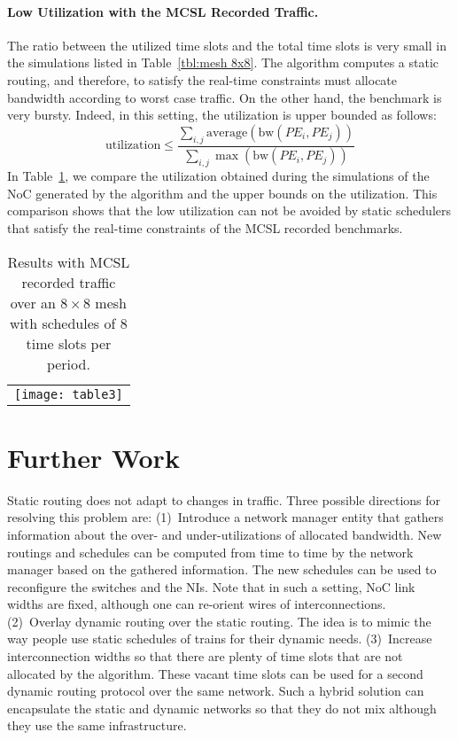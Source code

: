 \documentclass[a4paper,12pt]{article}
\newenvironment{proof sketch}[1]{\noindent {\emph{Proof sketch of #1:}}}{\hfill \qed}
\newcommand{\bw}{\textrm{bw}}
\begin{document}
\paragraph{Low Utilization with the MCSL Recorded Traffic.}  The ratio between the
utilized time slots and the total time slots is very small in the simulations
listed in Table~\ref{tbl:mesh 8x8}. The algorithm computes a static routing, and
therefore, to satisfy the real-time constraints must allocate bandwidth according to
worst case traffic. On the other hand, the benchmark is very bursty.  Indeed, in this
setting, the utilization is upper bounded as follows:
\[
\text{utilization}\leq \frac{\sum_{i,j} \text{average}(\bw(PE_i,PE_j))}
{\sum_{i,j} {\max}(\bw(PE_i,PE_j))}
\]
In Table~\ref{tbl:mcsl utilization}, we compare the utilization obtained during the simulations
of the NoC generated by the algorithm and the upper bounds on the utilization.
This comparison shows that the low utilization can not be avoided by static
schedulers that satisfy the real-time constraints of the MCSL recorded benchmarks.

%
\begin{table}
\centering
\begin{tabular}{c}
\texttt{[image: table3]}
\end{tabular}
  \caption{Results with MCSL recorded traffic over an $8\times 8$ mesh with schedules
    of $8$ time slots per period. }
  \label{tbl:mcsl utilization}
\end{table}
\section{Further Work}\label{sec:further}
Static routing does not adapt to changes in traffic. Three possible directions for
resolving this problem are: (1)~Introduce a network manager entity that gathers
information about the over- and under-utilizations of allocated bandwidth. New
routings and schedules can be computed from time to time by the network manager based
on the gathered information. The new schedules can be used to reconfigure the
switches and the NIs. Note that in such a setting, NoC link widths are fixed, although
one can re-orient wires of interconnections. (2)~Overlay dynamic routing over the
static routing. The idea is to mimic the way people use static schedules of trains
for their dynamic needs. (3)~Increase interconnection widths so that there are plenty
of time slots that are not allocated by the algorithm. These vacant time slots can be
used for a second dynamic routing protocol over the same network. Such a hybrid
solution can encapsulate the static and dynamic networks so that they do not mix although they use
the same infrastructure.




%


\end{document}
